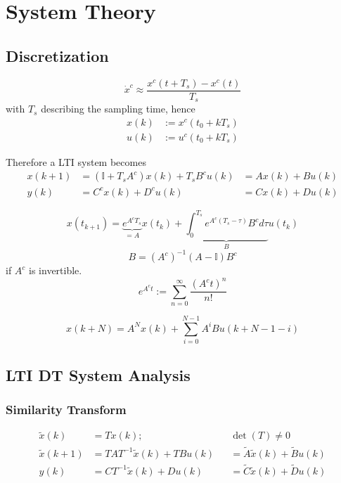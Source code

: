 \section{System Theory}
\subsection{Discretization}
\begin{equation*}
    \dot{x}^c \approx \frac{x^c(t + T_s)-x^c(t)}{T_s}
\end{equation*}
with $T_s$ describing the sampling time, hence
\begin{align*}
    x(k) & := x^c(t_0 + kT_s) \\
    u(k) & := u^c(t_0 + kT_s)
\end{align*}

Therefore a LTI system becomes
\begin{align*}
    x(k+1) & = (\mathbb{I} + T_s A^c) x(k) + T_s B^c u(k) & = A x(k) + B u(k) \\
    y(k)   & = C^c x(k) + D^c u(k)                        & = C x(k) + D u(k)
\end{align*}

\newpar{}
\begin{equation*}
    x(t_{k+1}) = \underbrace{e^{A^c T_s}}_{=A} x(t_k) + \underbrace{\int_{0}^{T_s} e^{A^c(T_s - \tau)}B^c d\tau}_{B} u(t_k)
\end{equation*}
\begin{equation*}
    B={(A^c)}^{-1}(A-\mathbb{I})B^c
\end{equation*}
if $A^c$ is invertible.
\begin{equation*}
    e^{A^c t} := \sum_{n=0}^{\infty}\frac{{(A^c t)}^n}{n!}
\end{equation*}

\newpar{}
\begin{equation*}
    x(k+N) = A^N x(k) + \sum_{i=0}^{N-1} A^i B u(k+N-1-i)
\end{equation*}

\subsection{LTI DT System Analysis}
\subsubsection{Similarity Transform}
\noindent
\begin{align*}
    \widetilde{x}(k)   & = Tx(k);                              &  & \det(T) \neq 0                                        \\
    \widetilde{x}(k+1) & = TAT^{-1} \widetilde{x}(k) + TB u(k) &  & = \widetilde{A} \widetilde{x}(k) + \widetilde{B} u(k) \\
    y(k)               & = CT^{-1} \widetilde{x}(k) + D u(k)   &  & = \widetilde{C} \widetilde{x}(k) + \widetilde{D} u(k)
\end{align*}

